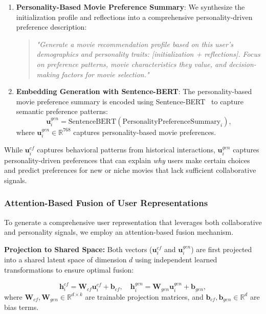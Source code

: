 \documentclass[acmsmall]{acmart}
\begin{document}
\begin{enumerate}
    \item \textbf{Personality-Based Movie Preference Summary}: We synthesize the initialization profile and reflections into a comprehensive personality-driven preference description:
    \begin{quote}
    \textit{"Generate a movie recommendation profile based on this user's demographics and personality traits: [initialization + reflections]. Focus on preference patterns, movie characteristics they value, and decision-making factors for movie selection."}
    \end{quote}
    
    \item \textbf{Embedding Generation with Sentence-BERT}: The personality-based movie preference summary is encoded using Sentence-BERT~\cite{reimers2019sentence} to capture semantic preference patterns:
    \begin{equation}
    \mathbf{u}^{gen}_i = \text{SentenceBERT}(\text{PersonalityPreferenceSummary}_i),    \label{eq:personality_encoding}
    \end{equation}
    where $\mathbf{u}^{gen}_i\in \mathbb{R}^{768}$ captures personality-based movie preferences.
    

\end{enumerate}

 While $\mathbf{u}^{cf}_i$ captures behavioral patterns from historical interactions, $\mathbf{u}^{gen}_i$ captures personality-driven preferences that can explain \textit{why} users make certain choices and predict preferences for new or niche movies that lack sufficient collaborative signals.

\subsubsection{Attention-Based Fusion of User Representations}
\label{sec:attention_fusion}

To generate a comprehensive user representation that leverages both collaborative and personality signals, we employ an attention-based fusion mechanism.

\textbf{Projection to Shared Space:} Both vectors ($\mathbf{u}^{cf}_i$ and $\mathbf{u}^{gen}_i$) are first projected into a shared latent space of dimension $d$ using independent learned transformations to ensure optimal fusion:

\begin{equation}
\mathbf{h}^{cf}_i = \mathbf{W}_{cf} \mathbf{u}^{cf}_i + \mathbf{b}_{cf}, \quad \mathbf{h}^{gen}_i = \mathbf{W}_{gen} \mathbf{u}^{gen}_i + \mathbf{b}_{gen},
\label{eq:projection_fusion}
\end{equation}
where $\mathbf{W}_{cf}, \mathbf{W}_{gen} \in \mathbb{R}^{d \times k}$ are trainable projection matrices, and $\mathbf{b}_{cf}, \mathbf{b}_{gen} \in \mathbb{R}^d$ are bias terms.
\end{document}
